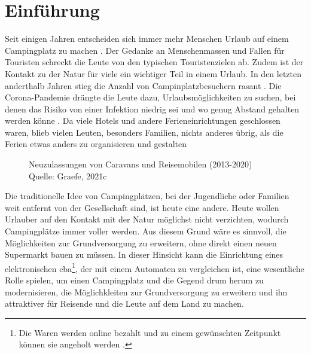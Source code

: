 \section{Einführung}


Seit einigen Jahren entscheiden sich immer mehr Menschen Urlaub auf einem Campingplatz zu machen 
\cite{periodical:ANST}. Der Gedanke an Menschenmassen und Fallen für Touristen schreckt die Leute von 
den typischen Touristenzielen ab. Zudem ist der Kontakt zu der Natur für viele ein wichtiger Teil 
in einem Urlaub. In den letzten anderthalb Jahren stieg die Anzahl von Campinplatzbesuchern rasant
\cite{periodical:UBST}. Die Corona-Pandemie drängte die Leute dazu, Urlaubsmöglichkeiten zu suchen, 
bei denen das Risiko von einer Infektion niedrig sei und wo genug Abstand gehalten werden könne
\cite{periodical:AUST}. Da viele Hotels und andere Ferieneinrichtungen geschlossen waren, blieb 
vielen Leuten, besonders Familien, nichts anderes übrig, als die Ferien etwas anders zu organisieren 
und gestalten 

\vfill
\begin{figure}[H]
    \caption{Neuzulassungen von Caravans und Reisemobilen (2013-2020) \\ Quelle: Graefe, 2021c}
    \label{fig:periodical_ANST}
\end{figure}

Die traditionelle Idee von Campingplätzen, bei der Jugendliche oder Familien weit entfernt von der 
Gesellschaft sind, ist heute eine andere. Heute wollen Urlauber auf den Kontakt mit der Natur
möglichst nicht verzichten, wodurch Campingplätze immer voller werden. Aus diesem Grund wäre es
sinnvoll, die Möglichkeiten zur Grundversorgung zu erweitern, ohne direkt einen neuen Supermarkt
bauen zu müssen. In dieser Hinsicht kann die Einrichtung eines elektronischen \acrfull{cba}\footnote{Die
Waren werden online bezahlt und zu einem gewünschten Zeitpunkt können sie angeholt werden \cite{refart:ECPG}.},
der mit einem Automaten zu vergleichen ist, eine wesentliche Rolle spielen, um einen Campingplatz und die 
Gegend drum herum zu modernisieren, die Möglichkleiten zur Grundversorgung zu erweitern und ihn attraktiver
für Reisende und die Leute auf dem Land zu machen.


